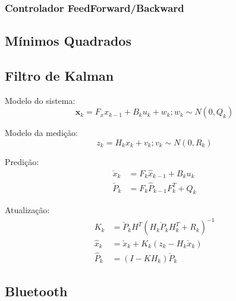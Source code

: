 \subsubsection{Controlador FeedForward/Backward}

\subsection{Mínimos Quadrados}

\subsection{Filtro de Kalman}

Modelo do sistema:
\begin{equation}
\textbf{x}_k = F_x x_{k-1} + B_k u_k + w_k; w_k \sim N(0, Q_k)
\end{equation}

Modelo da medição:
\begin{equation}
z_k = H_k x_k + v_k; v_k \sim N(0, R_k)
\end{equation}

Predição:
\begin{align*}
    \check{x}_k &= F_k \hat{x}_{k-1} + B_k u_k\\
    \check{P}_k &= F_k \hat{P}_{k-1} F^T_k + Q_k
\end{align*}

Atualização:
\begin{align*}
    K_k &= \check{P}_k H^T \left( H_k \check{P}_k H^T_k + R_k\right)^{-1}\\
    \hat{x}_k &= \check{x}_k + K_k\left( z_k - H_k \check{x}_k \right)\\
    \hat{P}_k &= \left(I - KH_k \right)\check{P}_k
\end{align*}


\subsection{Bluetooth}

